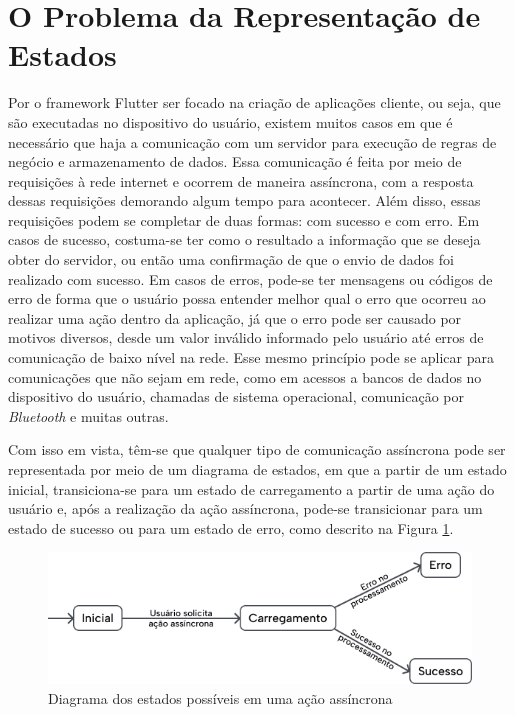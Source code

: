 \documentclass[12pt, %
openright, 
oneside, %
a4paper,    %
brazil]{facom-ufu-abntex2}
\begin{document}
\section{O Problema da Representação de Estados} \label{sec:state_representation}
Por o framework Flutter ser focado na criação de aplicações cliente, ou seja, que são executadas no dispositivo do usuário, existem muitos casos em que é necessário que haja a comunicação com um servidor para execução de regras de negócio e armazenamento de dados. Essa comunicação é feita por meio de requisições à rede internet e ocorrem de maneira assíncrona, com a resposta dessas requisições demorando algum tempo para acontecer. Além disso, essas requisições podem se completar de duas formas: com sucesso e com erro. Em casos de sucesso, costuma-se ter como o resultado a informação que se deseja obter do servidor, ou então uma confirmação de que o envio de dados foi realizado com sucesso. Em casos de erros, pode-se ter mensagens ou códigos de erro de forma que o usuário possa entender melhor qual o erro que ocorreu ao realizar uma ação dentro da aplicação, já que o erro pode ser causado por motivos diversos, desde um valor inválido informado pelo usuário até erros de comunicação de baixo nível na rede. Esse mesmo princípio pode se aplicar para comunicações que não sejam em rede, como em acessos a bancos de dados no dispositivo do usuário, chamadas de sistema operacional, comunicação por \textit{Bluetooth} e muitas outras.

Com isso em vista, têm-se que qualquer tipo de comunicação assíncrona pode ser representada por meio de um diagrama de estados, em que a partir de um estado inicial, transiciona-se para um estado de carregamento a partir de uma ação do usuário e, após a realização da ação assíncrona, pode-se transicionar para um estado de sucesso ou para um estado de erro, como descrito na Figura \ref{fig:states_diagram}.

\begin{figure}[ht]
    \centering
    \includegraphics[width=.6\textwidth]{figures/states/states_diagram.png}
    \caption{Diagrama dos estados possíveis em uma ação assíncrona}
    \label{fig:states_diagram}
\end{figure}
\end{document}
